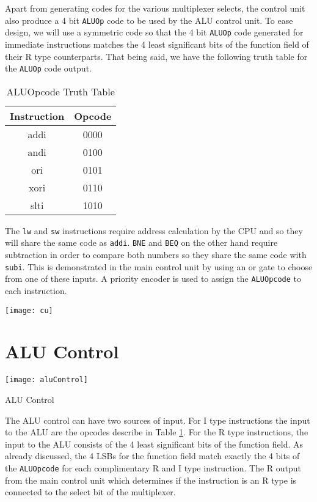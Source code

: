 \documentclass[12pt]{report}
\begin{document}
Apart from generating codes for the various multiplexer selects, the control unit also produce a 4 bit \texttt{ALUOp} code to be used by the ALU control unit. To ease design, we will use a symmetric code so that the 4 bit \texttt{ALUOp} code generated for immediate instructions matches the 4 least significant bits of the function field of their R type counterparts. That being said, we have the following truth table for the \texttt{ALUOp} code output.

\begin{longtable}{|c|c|}
\caption{ALUOpcode Truth Table} \label{aluTable}\\
\hline
Instruction&Opcode\\\hline
addi&0000\\\hline
andi&0100\\\hline
ori&0101\\\hline
xori&0110\\\hline
slti&1010\\\hline
\end{longtable}
The \texttt{lw} and \texttt{sw} instructions require address calculation by the CPU and so they will share the same code as \texttt{addi}. \texttt{BNE} and \texttt{BEQ} on the other hand require subtraction in order to compare both numbers so they share the same code with \texttt{subi}. This is demonstrated in the main control unit by using an or gate to choose from one of these inputs. A priority encoder is used to assign the \texttt{ALUOpcode} to each instruction.
\begin{adjustwidth}{-400pt}{-400pt}
\begin{center}
		\texttt{[image: cu]}%
\end{center}
\end{adjustwidth}
					\label{fig:cu}%
\section{ALU Control}
\begin{center}
\texttt{[image: aluControl]}%
\caption{ALU Control}
\end{center}
The ALU control can have two sources of input. For I type instructions the input to the ALU are the opcodes describe in Table \ref{aluTable}. For the R type instructions, the input to the ALU consists of the 4 least significant bits of the function field. As already discussed, the 4 LSBs for the function field match exactly the 4 bits of the \texttt{ALUOpcode} for each complimentary R and I type instruction. The R output from the main control unit which determines if the instruction is an R type is connected to the select bit of the multiplexer. 
\end{document}
